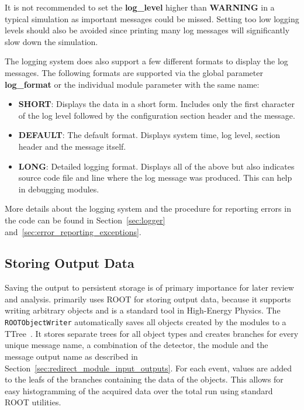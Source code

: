 \begin{warning}
    It is not recommended to set the \textbf{log\_level} higher than \textbf{WARNING} in a typical simulation as important messages could be missed.
    Setting too low logging levels should also be avoided since printing many log messages will significantly slow down the simulation.
\end{warning}

The logging system does also support a few different formats to display the log messages.
The following formats are supported via the global parameter \textbf{log\_format} or the individual module parameter with the same name:
\begin{itemize}
\item \textbf{SHORT}: Displays the data in a short form.
Includes only the first character of the log level followed by the configuration section header and the message.
\item \textbf{DEFAULT}: The default format.
Displays system time, log level, section header and the message itself.
\item \textbf{LONG}: Detailed logging format.
Displays all of the above but also indicates source code file and line where the log message was produced.
This can help in debugging modules.
\end{itemize}

More details about the logging system and the procedure for reporting errors in the code can be found in Section~\ref{sec:logger} and~\ref{sec:error_reporting_exceptions}.

\subsection{Storing Output Data}
\label{sec:storing_output_data}
Saving the output to persistent storage is of primary importance for later review and analysis.
\apsq primarily uses ROOT for storing output data, because it supports writing arbitrary objects and is a standard tool in High-Energy Physics.
The \texttt{ROOTObjectWriter} automatically saves all objects created by the modules to a TTree~\cite{roottree}.
It stores separate trees for all object types and creates branches for every unique message name, a combination of the detector, the module and the message output name as described in Section~\ref{sec:redirect_module_input_outputs}.
For each event, values are added to the leafs of the branches containing the data of the objects.
This allows for easy histogramming of the acquired data over the total run using standard ROOT utilities.

